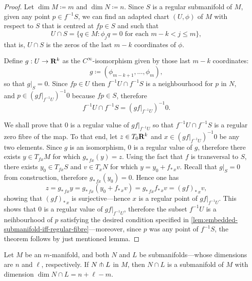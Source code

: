 \begin{proof}
    Let \(\dim M \coloneq m\) and \(\dim N \coloneq n\). Since \(S\) is a regular
    submanifold of \(M\), given any point \(p \in f^{-1} S\), we can find an adapted
    chart \((U, \phi)\) of \(M\) with respect to \(S\) that is centred at
    \(f p \in S\) and such that
    \[
        U \cap S = \{q \in M \colon \phi_j q = 0 \text{ for each } m - k < j \leq m\},
    \]
    that is, \(U \cap S\) is the zeros of the last \(m-k\) coordinates of \(\phi\).

    Define \(g: U \to \mathbf{R}^k\) as the \(C^{\infty}\)-isomorphism given by those last
    \(m-k\) coordinates:
    \[
        g \coloneq (\phi_{m-k+1}, \dots, \phi_m),
    \]
    so that \(g|_S = 0\). Since \(f p \in U\) then
    \(f^{-1} U \cap f^{-1} S\) is a neighbourhood for \(p\) in \(N\), and
    \(p \in (g f|_{f^{-1} U})^{-1} 0\) because \(f p \in S\), therefore
    \[
        f^{-1} U \cap f^{-1} S = (g f|_{f^{-1} U})^{-1} 0.
    \]

    We shall prove that \(0\) is a regular value of \(g f|_{f^{-1} U}\) so that
    \(f^{-1} U \cap f^{-1} S\) is a regular zero fibre of the map. To that
    end, let \(z \in T_0 \mathbf{R}^k\) and \(x \in (g f|_{f^{-1} U})^{-1} 0\) be any
    two elements. Since \(g\) is an isomorphism, \(0\) is a regular value of \(g\),
    therefore there exists \(y \in T_{f x} M\) for which \(g_{*\, f x}(y) =
    z\). Using the fact that \(f\) is transversal to \(S\), there exists
    \(y_0 \in T_{f x} S\) and \(v \in T_x N\) for which \(y = y_0 + f_{*\, x}
    v\). Recall that \(g|_S = 0\) from construction, therefore
    \(g_{*\, f x}(y_0) = 0\). Hence one has
    \[
        z = g_{*\, f x} y
        = g_{*\, f x}(y_0 + f_{*\, x} v)
        = g_{*\, f x} f_{*\, x} v
        = (g f)_{*\, x} v,
    \]
    showing that \((g f)_{*\, x}\) is surjective---hence \(x\) is a regular point of
    \(g f|_{f^{-1} U}\). This shows that \(0\) is a regular value of
    \(g f|_{f^{-1} U}\), therefore the subset \(f^{-1} U\) is a
    neihbourhood of \(p\) satisfying the desired condition specified in
    \cref{lem:embedded-submanifold-iff-regular-fibre}---moreover, since \(p\) was any
    point of \(f^{-1} S\), the theorem follows by just mentioned lemma.
\end{proof}

\begin{theorem}
    \label{thm:transversal-intersection-theorem}
    Let \(M\) be an \(m\)-manifold, and both \(N\) and \(L\) be submanifolds---whose
    dimensions are \(n\) and \(\ell\), respectively. If \(N \pitchfork L\) in \(M\),
    then \(N \cap L\) is a submanifold of \(M\) with dimension
    \(\dim N \cap L = n + \ell - m\).
\end{theorem}

